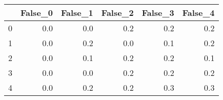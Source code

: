 \begin{tabular}{lrrrrr}
\toprule
{} &  False\_0 &  False\_1 &  False\_2 &  False\_3 &  False\_4 \\ \hline
\midrule
0 &      0.0 &      0.0 &      0.2 &      0.2 &      0.2 \\ \hline
1 &      0.0 &      0.2 &      0.0 &      0.1 &      0.2 \\ \hline
2 &      0.0 &      0.1 &      0.2 &      0.2 &      0.1 \\ \hline
3 &      0.0 &      0.0 &      0.2 &      0.2 &      0.2 \\ \hline
4 &      0.0 &      0.2 &      0.2 &      0.3 &      0.3 \\ \hline
\bottomrule
\end{tabular}
